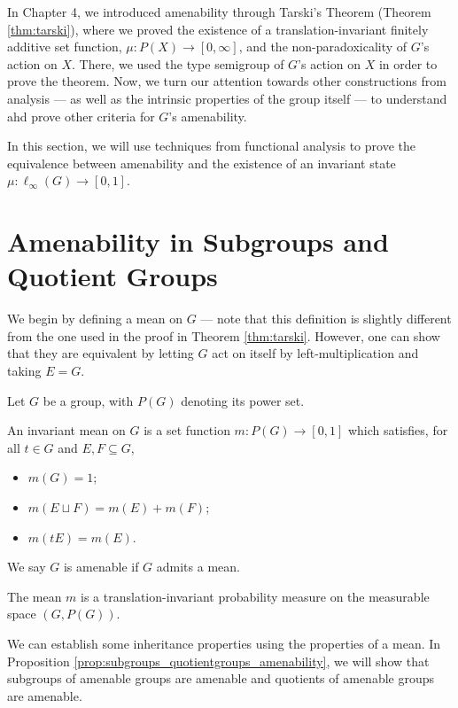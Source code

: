 In Chapter 4, we introduced amenability through Tarski's Theorem (Theorem \ref{thm:tarski}), where we proved the existence of a translation-invariant finitely additive set function, $\mu\colon P(X)\rightarrow [0,\infty]$, and the non-paradoxicality of $G$'s action on $X$. There, we used the type semigroup of $G$'s action on $X$ in order to prove the theorem. Now, we turn our attention towards other constructions from analysis --- as well as the intrinsic properties of the group itself --- to understand ahd prove other criteria for $G$'s amenability.\newline

In this section, we will use techniques from functional analysis to prove the equivalence between amenability and the existence of an invariant state $\mu\colon \ell_{\infty}(G) \rightarrow [0,1]$.
\section{Amenability in Subgroups and Quotient Groups}\label{sec:amenability_subgroups_quotients}%
We begin by defining a mean on $G$ --- note that this definition is slightly different from the one used in the proof in Theorem \ref{thm:tarski}. However, one can show that they are equivalent by letting $G$ act on itself by left-multiplication and taking $E = G$.
\begin{definition}
  Let $G$ be a group, with $P(G)$ denoting its power set.\newline

  An invariant mean on $G$ is a set function $m\colon P(G)\rightarrow [0,1]$ which satisfies, for all $t\in G$ and $E,F\subseteq G$,
  \begin{itemize}
    \item $m(G) = 1$;
    \item $m\left(E\sqcup F\right) = m(E) + m(F)$;
    \item $m\left(tE\right) = m\left(E\right)$.
  \end{itemize}
  We say $G$ is amenable if $G$ admits a mean.\newline

  The mean $m$ is a translation-invariant probability measure on the measurable space $\left(G,P(G)\right)$.
\end{definition}
We can establish some inheritance properties using the properties of a mean. In Proposition \ref{prop:subgroups_quotientgroups_amenability}, we will show that subgroups of amenable groups are amenable and quotients of amenable groups are amenable.

